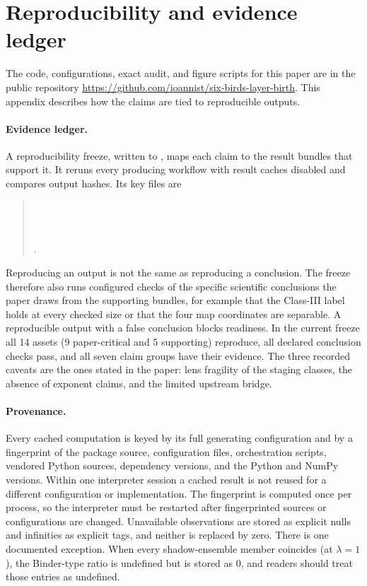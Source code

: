 \section{Reproducibility and evidence ledger}
\label{app:reproducibility-ledger}

The code, configurations, exact audit, and figure scripts for this paper are in the public repository \url{https://github.com/ioannist/six-birds-layer-birth}. This appendix describes how the claims are tied to reproducible outputs.

\paragraph{Evidence ledger.} A reproducibility freeze, written to , maps each claim to the result bundles that support it. It reruns every producing workflow with result caches disabled and compares output hashes. Its key files are
\begin{quote}
\\
\\
\\
.
\end{quote}
Reproducing an output is not the same as reproducing a conclusion. The freeze therefore also runs configured checks of the specific scientific conclusions the paper draws from the supporting bundles, for example that the Class-III label holds at every checked size or that the four map coordinates are separable. A reproducible output with a false conclusion blocks readiness. In the current freeze all 14 assets (9 paper-critical and 5 supporting) reproduce, all declared conclusion checks pass, and all seven claim groups have their evidence. The three recorded caveats are the ones stated in the paper: lens fragility of the staging classes, the absence of exponent claims, and the limited upstream bridge.

\paragraph{Provenance.} Every cached computation is keyed by its full generating configuration and by a fingerprint of the package source, configuration files, orchestration scripts, vendored Python sources, dependency versions, and the Python and NumPy versions. Within one interpreter session a cached result is not reused for a different configuration or implementation. The fingerprint is computed once per process, so the interpreter must be restarted after fingerprinted sources or configurations are changed. Unavailable observations are stored as explicit nulls and infinities as explicit tags, and neither is replaced by zero. There is one documented exception. When every shadow-ensemble member coincides (at $\lambda=1$), the Binder-type ratio is undefined but is stored as $0$, and readers should treat those entries as undefined.

